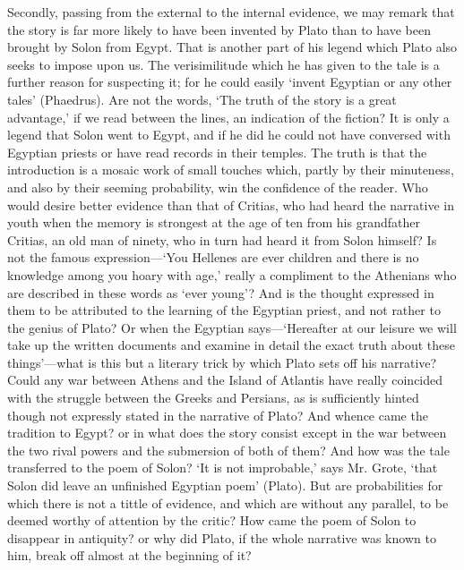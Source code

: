 \documentclass[11pt,letter]{article}
\begin{document}
\par  Secondly, passing from the external to the internal evidence, we may remark that the story is far more likely to have been invented by Plato than to have been brought by Solon from Egypt. That is another part of his legend which Plato also seeks to impose upon us. The verisimilitude which he has given to the tale is a further reason for suspecting it; for he could easily ‘invent Egyptian or any other tales’ (Phaedrus). Are not the words, ‘The truth of the story is a great advantage,’ if we read between the lines, an indication of the fiction? It is only a legend that Solon went to Egypt, and if he did he could not have conversed with Egyptian priests or have read records in their temples. The truth is that the introduction is a mosaic work of small touches which, partly by their minuteness, and also by their seeming probability, win the confidence of the reader. Who would desire better evidence than that of Critias, who had heard the narrative in youth when the memory is strongest at the age of ten from his grandfather Critias, an old man of ninety, who in turn had heard it from Solon himself? Is not the famous expression—‘You Hellenes are ever children and there is no knowledge among you hoary with age,’ really a compliment to the Athenians who are described in these words as ‘ever young’? And is the thought expressed in them to be attributed to the learning of the Egyptian priest, and not rather to the genius of Plato? Or when the Egyptian says—‘Hereafter at our leisure we will take up the written documents and examine in detail the exact truth about these things’—what is this but a literary trick by which Plato sets off his narrative? Could any war between Athens and the Island of Atlantis have really coincided with the struggle between the Greeks and Persians, as is sufficiently hinted though not expressly stated in the narrative of Plato? And whence came the tradition to Egypt? or in what does the story consist except in the war between the two rival powers and the submersion of both of them? And how was the tale transferred to the poem of Solon? ‘It is not improbable,’ says Mr. Grote, ‘that Solon did leave an unfinished Egyptian poem’ (Plato). But are probabilities for which there is not a tittle of evidence, and which are without any parallel, to be deemed worthy of attention by the critic? How came the poem of Solon to disappear in antiquity? or why did Plato, if the whole narrative was known to him, break off almost at the beginning of it?
\end{document}

